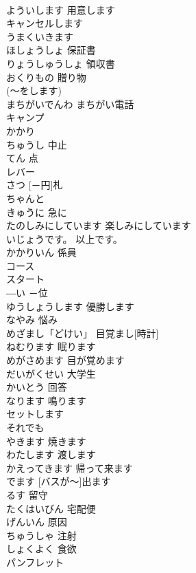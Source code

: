 \documentclass[8pt]{extreport}
\begin{document}
\begin{CJK}{UTF8}{min}
\\	よういします	用意します	
\\	キャンセルします			
\\	うまくいきます			
\\	ほしょうしょ	保証書	
\\	りょうしゅうしょ	領収書	
\\	おくりもの	贈り物	
\\	(～をします)		
\\	まちがいでんわ	まちがい電話	
\\	キャンプ			
\\	かかり			
\\	ちゅうし	中止	
\\	てん	点	
\\	レバー			
\\	[－えん]さつ	[－円]札	
\\	ちゃんと			
\\	きゅうに	急に	
\\	たのしみにしています	楽しみにしています	
\\	いじょうです。	以上です。		
\\	かかりいん	係員	
\\	コース			
\\	スタート			
\\	―い	－位	
\\	ゆうしょうします	優勝します	
\\	なやみ	悩み	
\\	めざまし「どけい」	目覚まし[時計]	
\\	ねむります	眠ります	
\\	めがさめます	目が覚めます	
\\	だいがくせい	大学生	
\\	かいとう	回答	
\\	なります	鳴ります	
\\	セットします			
\\	それでも			
\\	やきます	焼きます	
\\	わたします	渡します	
\\	かえってきます	帰って来ます	
\\	[バスが～]でます	[バスが～]出ます	
\\	るす	留守	
\\	たくはいびん	宅配便	
\\	げんいん	原因	
\\	ちゅうしゃ	注射	
\\	しょくよく	食欲	
\\	パンフレット			

\end{CJK}
\end{document}
